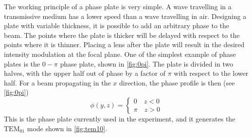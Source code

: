 The working principle of a phase plate is very simple. A wave travelling in a transmissive medium has a lower speed than a wave travelling in air. Designing a plate with variable thickness, it is possible to add an arbitrary phase to the beam. The points where the plate is thicker will be delayed with respect to the points where it is thinner. Placing a lens after the plate will result in the desired intensity modulation at the focal plane.
One of the simplest example of phase plates is the $0-\pi$ phase plate, shown in \cref{fig:0pi}. The plate is divided in two halves, with the upper half out of phase by a factor of $\pi$ with respect to the lower half. For a beam propagating in the $x$ direction, the phase profile is then (see \cref{fig:0pi})
\begin{equation}
    \phi(y,z) =
    \begin{cases}
        0 \quad z < 0 \\
        \pi \quad z > 0
    \end{cases}
\end{equation}
This is the phase plate currently used in the experiment, and it generates the $\text{TEM}_{01}$ mode shown in \cref{fig:tem10}.
